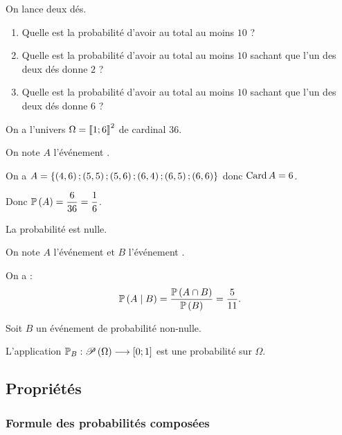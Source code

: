 \begin{exoex}
On lance deux dés.

\begin{enumerate}
    \item Quelle est la probabilité d'avoir au total au moins \(10\) ? \\
    \item Quelle est la probabilité d'avoir au total au moins \(10\) sachant que l'un des deux dés donne \(2\) ? \\
    \item Quelle est la probabilité d'avoir au total au moins \(10\) sachant que l'un des deux dés donne \(6\) ?
\end{enumerate}
\end{exoex}

\begin{corr}[1]
On a l'univers \(\Omega=\left\llbracket1;6\right\rrbracket^2\) de cardinal \(36\).

On note \(A\) l'événement .

On a \(A=\left\lbrace\left(4,6\right);\left(5,5\right);\left(5,6\right);\left(6,4\right);\left(6,5\right);\left(6,6\right)\right\rbrace\) donc \(\operatorname{Card} A=6\).

Donc \(\mathbb{P}\left(A\right)=\dfrac{6}{36}=\dfrac{1}{6}\).
\end{corr}

\begin{corr}[2]
La probabilité est nulle.
\end{corr}

\begin{corr}[3]
On note \(A\) l'événement  et \(B\) l'événement .

On a : \[\mathbb{P}\left(A\mid B\right)=\dfrac{\mathbb{P}\left(A\cap B\right)}{\mathbb{P}\left(B\right)}=\dfrac{5}{11}.\]
\end{corr}

\begin{prop}
Soit \(B\) un événement de probabilité non-nulle.

L'application \(\mathbb{P}_B:\mathscr{P}\left(\Omega\right)\longrightarrow\left[0;1\right]\) est une probabilité sur \(\Omega\).
\end{prop}

\subsection{Propriétés}

\subsubsection{Formule des probabilités composées}

